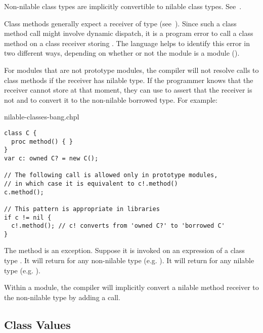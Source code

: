 Non-nilable class types are implicitly convertible to nilable class
types. See~.

Class methods generally expect a receiver of type 
(see~).  Since such a class method call might involve
dynamic dispatch, it is a program error to call a class method on a class
receiver storing . The language helps to identify this error in
two different ways, depending on whether or not the module is a
 module ().

For modules that are not prototype modules, the compiler will not
resolve calls to class methods if the receiver has nilable type.
If the programmer knows that the receiver cannot store  at that
moment, they can use \chpl{!} to assert that the receiver is not
 and to convert it to the non-nilable borrowed type. For
example:

\begin{chapelexample}{nilable-classes-bang.chpl}
\begin{chapel}
\begin{verbatim}
class C {
  proc method() { }
}
var c: owned C? = new C();

// The following call is allowed only in prototype modules,
// in which case it is equivalent to c!.method()
c.method();

// This pattern is appropriate in libraries
if c != nil {
  c!.method(); // c! converts from 'owned C?' to 'borrowed C'
}
\end{verbatim}
\end{chapel}
\end{chapelexample}

The  method is an exception. Suppose it is invoked on
an expression of a class type .
It will return  for any non-nilable
 type (e.g. ). It will return 
for any nilable  type (e.g. ).

\label{Methods_On_Nilable_In_Prototype_Modules}

Within a  module, the compiler will implicitly convert
a nilable method receiver to the non-nilable type by adding a \chpl{!}
call.

\subsection{Class Values}
\label{Class_Values}

